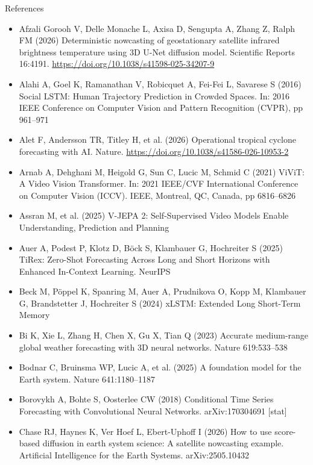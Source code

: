 \documentclass{beamer}
\begin{document}
\begin{frame}[allowframebreaks]{References}
    \tiny
    \begin{itemize}
        \item[] Afzali Gorooh V, Delle Monache L, Axisa D, Sengupta A, Zhang Z, Ralph FM (2026) Deterministic nowcasting of geostationary satellite infrared brightness temperature using 3D U-Net diffusion model. Scientific Reports 16:4191. \url{https://doi.org/10.1038/s41598-025-34207-9}
        \item[] Alahi A, Goel K, Ramanathan V, Robicquet A, Fei-Fei L, Savarese S (2016) Social LSTM: Human Trajectory Prediction in Crowded Spaces. In: 2016 IEEE Conference on Computer Vision and Pattern Recognition (CVPR), pp 961--971
        \item[] Alet F, Andersson TR, Titley H, et al. (2026) Operational tropical cyclone forecasting with AI. Nature. \url{https://doi.org/10.1038/s41586-026-10953-2}
        \item[] Arnab A, Dehghani M, Heigold G, Sun C, Lucic M, Schmid C (2021) ViViT: A Video Vision Transformer. In: 2021 IEEE/CVF International Conference on Computer Vision (ICCV). IEEE, Montreal, QC, Canada, pp 6816--6826
        \item[] Assran M, et al. (2025) V-JEPA 2: Self-Supervised Video Models Enable Understanding, Prediction and Planning
        \item[] Auer A, Podest P, Klotz D, Böck S, Klambauer G, Hochreiter S (2025) TiRex: Zero-Shot Forecasting Across Long and Short Horizons with Enhanced In-Context Learning. NeurIPS
        \item[] Beck M, Pöppel K, Spanring M, Auer A, Prudnikova O, Kopp M, Klambauer G, Brandstetter J, Hochreiter S (2024) xLSTM: Extended Long Short-Term Memory
        \item[] Bi K, Xie L, Zhang H, Chen X, Gu X, Tian Q (2023) Accurate medium-range global weather forecasting with 3D neural networks. Nature 619:533--538
        \item[] Bodnar C, Bruinsma WP, Lucic A, et al. (2025) A foundation model for the Earth system. Nature 641:1180--1187
        \item[] Borovykh A, Bohte S, Oosterlee CW (2018) Conditional Time Series Forecasting with Convolutional Neural Networks. arXiv:170304691 [stat]
        \item[] Chase RJ, Haynes K, Ver Hoef L, Ebert-Uphoff I (2026) How to use score-based diffusion in earth system science: A satellite nowcasting example. Artificial Intelligence for the Earth Systems. arXiv:2505.10432

\end{itemize}
\end{frame}
\end{document}
